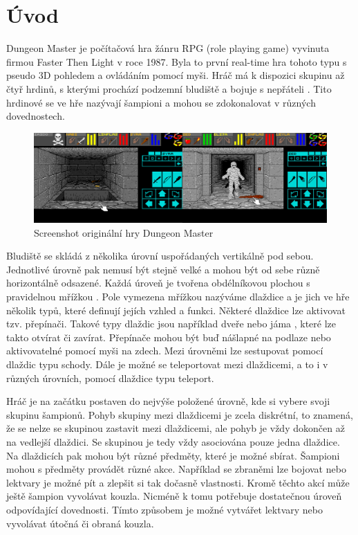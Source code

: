 \chapter{Úvod}

Dungeon Master je počítačová hra žánru RPG (role playing game) vyvinuta firmou Faster Then Light v roce 1987.
Byla to první real-time hra tohoto typu s pseudo 3D pohledem a ovládáním pomocí myši. Hráč má k dispozici skupinu až čtyř hrdinů,
s kterými prochází podzemní bludiště a bojuje s nepřáteli . Tito hrdinové se ve hře nazývají šampioni a mohou se 
zdokonalovat v různých dovednostech. 

\begin{figure}[H]\centering
\includegraphics[width=\textwidth]{./img/DM-original-screen.png}
\caption{Screenshot originální hry Dungeon Master}
\label{obr0:uvod}
\end{figure}

Bludiště se skládá z několika úrovní uspořádaných vertikálně pod sebou. 
Jednotlivé úrovně pak nemusí být stejně velké a mohou být od sebe různě horizontálně odsazené.
Každá úroveň je tvořena obdélníkovou plochou s pravidelnou mřížkou . Pole vymezena mřížkou nazýváme dlaždice a je jich 
ve hře několik typů, které definují jejích vzhled a funkci. Některé dlaždice lze aktivovat tzv. přepínači. Takové typy dlaždic
jsou například dveře nebo jáma , které lze takto otvírat či zavírat. Přepínače mohou být buď nášlapné na podlaze nebo aktivovatelné
pomocí myši na zdech. Mezi úrovněmi lze sestupovat pomocí dlaždic typu schody.  Dále je možné se teleportovat mezi dlaždicemi, a to i v různých úrovních, pomocí dlaždice
typu teleport. 


Hráč je na začátku postaven do nejvýše položené úrovně, kde si vybere svoji skupinu šampionů. 
Pohyb skupiny mezi dlaždicemi je zcela diskrétní, to znamená, že se nelze se skupinou zastavit mezi dlaždicemi, ale pohyb je vždy dokončen
až na vedlejší dlaždici. Se skupinou je tedy vždy asociována pouze jedna dlaždice. Na dlaždicích pak mohou
být různé předměty, které je možné sbírat. Šampioni mohou s předměty provádět různé akce.
Například se zbraněmi lze bojovat nebo lektvary je možné pít a zlepšit si tak dočasně vlastnosti. Kromě těchto 
akcí může ještě šampion vyvolávat kouzla. Nicméně k tomu potřebuje dostatečnou úroveň odpovídající dovednosti.
Tímto způsobem je možné vytvářet lektvary nebo vyvolávat útočná či obraná kouzla.

